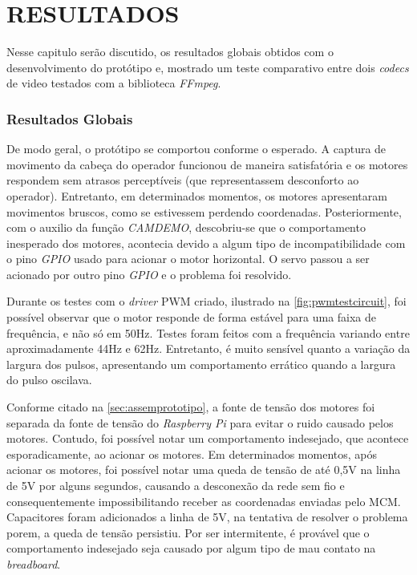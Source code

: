 
\chapter{RESULTADOS}
\label{chap:resultados}

Nesse capitulo serão discutido, os resultados globais obtidos com o desenvolvimento do protótipo e, mostrado um teste comparativo entre dois \textit{codecs} de video testados com a biblioteca \textit{FFmpeg}.\par

\subsection{Resultados Globais}
\label{subsec:resglobais}

De modo geral, o protótipo se comportou conforme o esperado. A captura de movimento da cabeça do operador funcionou de maneira satisfatória e os motores respondem sem atrasos perceptíveis (que representassem desconforto ao operador). Entretanto, em determinados momentos, os motores apresentaram movimentos bruscos, como se estivessem perdendo coordenadas. Posteriormente, com o auxilio da função \textit{CAMDEMO},  descobriu-se que o comportamento inesperado dos motores, acontecia devido a algum tipo de incompatibilidade com o pino \textit{GPIO} usado para acionar o motor horizontal. O servo passou a ser acionado por outro pino \textit{GPIO} e o problema foi resolvido.\par

Durante os testes com o \textit{driver} PWM criado, ilustrado na \autoref{fig:pwmtestcircuit}, foi possível observar que o motor responde de forma estável para uma faixa de frequência, e não só em 50Hz. Testes foram feitos com a frequência variando entre aproximadamente 44Hz e 62Hz. Entretanto, é muito sensível quanto a variação da largura dos pulsos, apresentando um comportamento errático quando a largura do pulso oscilava.\par

Conforme citado na \autoref{sec:assemprototipo}, a fonte de tensão dos motores foi separada da fonte de tensão do \textit{Raspberry Pi} para evitar o ruido causado pelos motores. Contudo, foi possível notar um comportamento indesejado, que acontece esporadicamente, ao acionar os motores. Em determinados momentos, após acionar os motores, foi possível notar uma queda de tensão de até 0,5V na linha de 5V por alguns segundos, causando a desconexão da rede sem fio e consequentemente impossibilitando receber as coordenadas enviadas pelo MCM. Capacitores foram adicionados a linha de 5V, na tentativa de resolver o problema porem, a queda de tensão persistiu. Por ser intermitente, é provável que o comportamento indesejado seja causado por algum tipo de mau contato na \textit{breadboard}. \par

